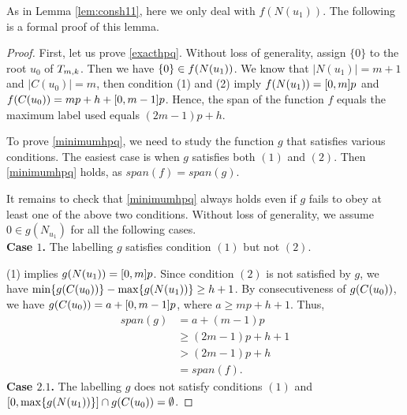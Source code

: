 As in Lemma \ref{lem:consh11}, here we only deal with $f(N(u_1))$. The following is a formal proof of this lemma. 
\\
\begin{proof}
First, let us prove \eqref{exacthpq}. Without loss of generality, assign $\{0\}$ to the root $u_0$ of $T_{m,k}$. Then we have $\{0\} \in f(N(u_1))$. We know that $|N(u_1)| = m+1$ and $|C(u_0)| = m$, then condition (1) and (2) imply $f(N(u_1)) = [0,m]p$ and $f(C(u_0)) = mp+h+[0,m-1]p$. Hence, the span of the function $f$ equals the maximum label used equals $(2m-1)p+h$. 

To prove \eqref{minimumhpq}, we need to study the function $g$ that satisfies various conditions. The easiest case is when $g$ satisfies both $(1)$ and $(2)$. Then \eqref{minimumhpq} holds, as $span(f) = span(g)$. 

It remains to check that \eqref{minimumhpq} always holds even if $g$ fails to obey at least one of the above two conditions. Without loss of generality, we assume $0 \in g(N_{u_1})$ for all the following cases. 
\\
\textbf{Case $1$.} The labelling $g$ satisfies condition $(1)$ but not $(2)$. 

(1) implies $g(N(u_1))= [0, m]p$. Since condition $(2)$ is not satisfied by $g$, we have $\min\{g(C(u_0))\} - \max\{g(N(u_1))\} \ge h+1$. By consecutiveness of $g(C(u_0))$, we have $g(C(u_0)) = a+[0,m-1]p$, where $a \ge mp+h+1$. Thus, 
\begin{align*}
span(g) &= a+(m-1)p \\
&\ge (2m-1)p+h+1 \\
&> (2m-1)p+h\\
&= span(f).
\end{align*}
\textbf{Case $2.1$.} The labelling $g$ does not satisfy conditions $(1)$ and \\$[0, \max\{g(N(u_1))\}] \cap g(C(u_0)) = \emptyset$. 


\end{proof}
